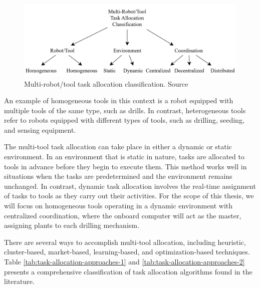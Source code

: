 \begin{figure}[bth]
    \centering
    \includegraphics[width=0.9\linewidth]{gfx/ch01/task-allocation-classification.png}
    \caption{Multi-robot/tool task allocation classification. Source \cite{10.1145/3700591}}
    \label{fig:task-allocation-classification}
\end{figure}

An example of homogeneous tools in this context is a robot equipped with multiple tools of the same type, such as drills. In contrast, heterogeneous tools refer to robots equipped with different types of tools, such as drilling, seeding, and sensing equipment.

The multi-tool task allocation can take place in either a dynamic or static environment. In an environment that is static in nature, tasks are allocated to tools in advance before they begin to execute them. This method works well in situations when the tasks are predetermined and the environment remains unchanged. In contrast, dynamic task allocation involves the real-time assignment of tasks to tools as they carry out their activities. For the scope of this thesis, we will focus on homogeneous tools operating in a dynamic environment with centralized coordination, where the onboard computer will act as the master, assigning plants to each drilling mechanism.

There are several ways to accomplish multi-tool allocation, including heuristic, cluster-based, market-based, learning-based, and optimization-based techniques. Table \ref{tab:task-allocation-approaches-1} and \ref{tab:task-allocation-approaches-2} presents a comprehensive classification of task allocation algorithms found in the literature.


